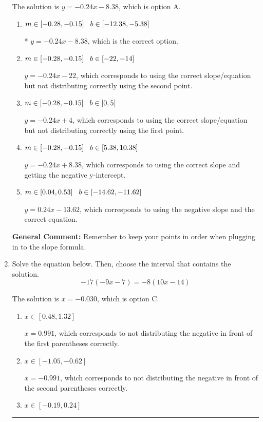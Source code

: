 \documentclass{extbook}[14pt]
\newcommand{\litem}[1]{\item #1

\rule{\textwidth}{0.4pt}}
\begin{document}
\begin{enumerate}
{The solution is \( y = -0.24x -8.38 \), which is option A.\begin{enumerate}[label=\Alph*.]
\item \( m \in [-0.28, -0.15] \hspace*{3mm} b \in [-12.38, -5.38] \)

* $y = -0.24x -8.38$, which is the correct option.
\item \( m \in [-0.28, -0.15] \hspace*{3mm} b \in [-22, -14] \)

 $y = -0.24x -22$, which corresponds to using the correct slope/equation but not distributing correctly using the second point.
\item \( m \in [-0.28, -0.15] \hspace*{3mm} b \in [0, 5] \)

 $y = -0.24x + 4$, which corresponds to using the correct slope/equation but not distributing correctly using the first point.
\item \( m \in [-0.28, -0.15] \hspace*{3mm} b \in [5.38, 10.38] \)

 $y = -0.24x + 8.38$, which corresponds to using the correct slope and getting the negative y-intercept.
\item \( m \in [0.04, 0.53] \hspace*{3mm} b \in [-14.62, -11.62] \)

 $y = 0.24x -13.62$, which corresponds to using the negative slope and the correct equation.
\end{enumerate}

\textbf{General Comment:} Remember to keep your points in order when plugging in to the slope formula.
}
\litem{
Solve the equation below. Then, choose the interval that contains the solution.
\[ -17(-9x -7) = -8(10x -14) \]

The solution is \( x = -0.030 \), which is option C.\begin{enumerate}[label=\Alph*.]
\item \( x \in [0.48, 1.32] \)

$x = 0.991$, which corresponds to not distributing the negative in front of the first parentheses correctly.
\item \( x \in [-1.05, -0.62] \)

$x = -0.991$, which corresponds to not distributing the negative in front of the second parentheses correctly.
\item \( x \in [-0.19, 0.24] \)


\end{enumerate}}
\end{enumerate}
\end{document}
